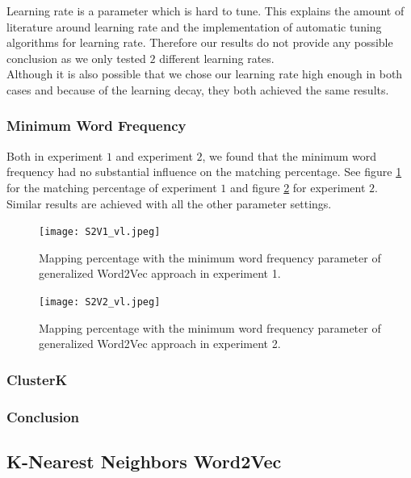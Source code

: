 Learning rate is a parameter which is hard to tune. This explains the amount of literature around learning rate and the implementation of automatic tuning algorithms for learning rate. Therefore our results do not provide any possible conclusion as we only tested $2$ different learning rates. \\
Although it is also possible that we chose our learning rate high enough in both cases and because of the learning decay, they both achieved the same results.

\subsubsection*{Minimum Word Frequency}

Both in experiment $1$ and experiment $2$, we found that the minimum word frequency had no substantial influence on the matching percentage. See figure \ref{fig:s2v_vl_1} for the matching percentage of experiment $1$ and figure \ref{fig:s2v_vl_2} for experiment $2$. Similar results are achieved with all the other parameter settings. \\

\begin{figure}[!htb]
	\centering
	\texttt{[image: S2V1\_vl.jpeg]}
	\caption{Mapping percentage with the minimum word frequency parameter of generalized Word2Vec approach in experiment 1.}
	\label{fig:s2v_vl_1}
\end{figure}

\begin{figure}[!htb]
	\centering
	\texttt{[image: S2V2\_vl.jpeg]}
	\caption{Mapping percentage with the minimum word frequency parameter of generalized Word2Vec approach in experiment 2.}
	\label{fig:s2v_vl_2}
\end{figure}



\subsubsection*{ClusterK}


\subsubsection*{Conclusion}



\subsection{K-Nearest Neighbors Word2Vec}

